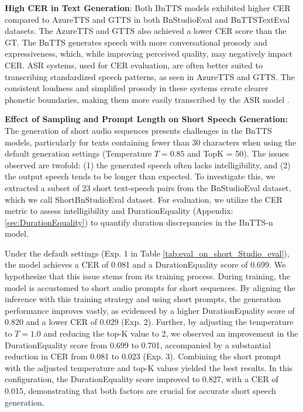 \noindent \textbf{High CER in Text Generation}: Both BnTTS models exhibited higher CER compared to AzureTTS and GTTS in both BnStudioEval and BnTTSTextEval datasets. The AzureTTS and GTTS also achieved a lower CER score than the GT. The BnTTS generates speech with more conversational prosody and expressiveness, which, while improving perceived quality, may negatively impact CER. ASR systems, used for CER evaluation, are often better suited to transcribing standardized speech patterns, as seen in AzureTTS and GTTS. The consistent loudness and simplified prosody in these systems create clearer phonetic boundaries, making them more easily transcribed by the ASR model \cite{Yeunju2022, Wagner2019}.


\noindent \textbf{Effect of Sampling and Prompt Length on Short Speech Generation:} 
The generation of short audio sequences presents challenges in the BnTTS models, particularly for texts containing fewer than 30 characters when using the default generation settings (Temperature \(T = 0.85\) and TopK = 50). The issues observed are twofold: (1) the generated speech often lacks intelligibility, and (2) the output speech tends to be longer than expected. To investigate this, we extracted a subset of 23 short text-speech pairs from the BnStudioEval dataset, which we call ShortBnStudioEval dataset. For evaluation, we utilize the CER metric to assess intelligibility and DurationEquality (Appendix: \ref{sec:DurationEquality}) to quantify duration discrepancies in the BnTTS-n model.

Under the default settings (Exp. 1 in Table \ref{tab:eval_on_short_Studio_eval}), the model achieves a CER of 0.081 and a DurationEquality score of 0.699. We hypothesize that this issue stems from its training process. During training, the model is accustomed to short audio prompts for short sequences. By aligning the inference with this training strategy and using short prompts, the generation performance improves vastly, as evidenced by a higher DurationEquality score of 0.820 and a lower CER of 0.029 (Exp. 2). Further, by adjusting the temperature to \(T = 1.0\) and reducing the top-K value to 2, we observed an improvement in the DurationEquality score from 0.699 to 0.701, accompanied by a substantial reduction in CER from 0.081 to 0.023 (Exp. 3). Combining the short prompt with the adjusted temperature and top-K values yielded the best results. In this configuration, the DurationEquality score improved to 0.827, with a CER of 0.015, demonstrating that both factors are crucial for accurate short speech generation.


